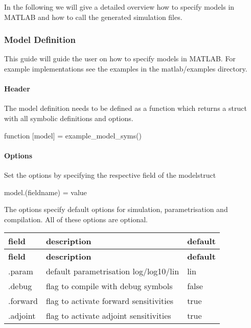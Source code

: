 In the following we will give a detailed overview how to specify models in M\+A\+T\+L\+AB and how to call the generated simulation files.

\subsubsection*{Model Definition}

This guide will guide the user on how to specify models in M\+A\+T\+L\+AB. For example implementations see the examples in the matlab/examples directory.

\paragraph*{Header}

The model definition needs to be defined as a function which returns a struct with all symbolic definitions and options. \begin{DoxyVerb}function [model] = example_model_syms()
\end{DoxyVerb}


\paragraph*{Options}

Set the options by specifying the respective field of the modelstruct \begin{DoxyVerb}model.(fieldname) = value
\end{DoxyVerb}


The options specify default options for simulation, parametrisation and compilation. All of these options are optional.

\tabulinesep=1mm
\begin{longtabu} spread 0pt [c]{*{3}{|X[-1]}|}
\hline
\rowcolor{\tableheadbgcolor}\textbf{ field  }&\textbf{ description  }&\textbf{ default   }\\
\endfirsthead
\hline
\endfoot
\hline
\rowcolor{\tableheadbgcolor}\textbf{ field  }&\textbf{ description  }&\textbf{ default   }\\
\endhead
.param  &default parametrisation \textquotesingle{}log\textquotesingle{}/\textquotesingle{}log10\textquotesingle{}/\textquotesingle{}lin\textquotesingle{}  &\textquotesingle{}lin\textquotesingle{}   \\
.debug  &flag to compile with debug symbols  &false   \\
.forward  &flag to activate forward sensitivities  &true   \\
.adjoint  &flag to activate adjoint sensitivities  &true   \\
\end{longtabu}


